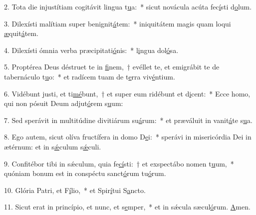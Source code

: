 2. Tota die injustítiam cogitávit lingua t\uline{u}a:~* sicut novácula acúta fec\uline{í}sti d\uline{o}lum.\par 
3. Dilexísti malítiam super benignit\uline{á}tem:~* iniquitátem magis quam loqui \uline{æ}quit\uline{á}tem.\par 
4. Dilexísti ómnia verba præcipitati\uline{ó}nis:~* l\uline{i}ngua dol\uline{ó}sa.\par 
5. Proptérea Deus déstruet te in \uline{fi}nem,~† evéllet te, et emigrábit te de tabernáculo t\uline{u}o:~* et radícem tuam de t\uline{e}rra viv\uline{é}ntium.\par 
6. Vidébunt justi, et ti\uline{mé}bunt,~† et super eum ridébunt et d\uline{i}cent:~* Ecce homo, qui non pósuit Deum adjut\uline{ó}rem s\uline{u}um:\par 
7. Sed sperávit in multitúdine divitiárum su\uline{á}rum:~* et præváluit in vanit\uline{á}te s\uline{u}a.\par 
8. Ego autem, sicut olíva fructífera in domo D\uline{e}i:~* sperávi in misericórdia Dei in ætérnum: et in s\uline{ǽ}culum s\uline{ǽ}culi.\par 
9. Confitébor tibi in sǽculum, quia fe\uline{cí}sti:~† et exspectábo nomen t\uline{u}um,~* quóniam bonum est in conspéctu sanct\uline{ó}rum tu\uline{ó}rum.\par 
10. Glória Patri, et F\uline{í}lio,~* et Spir\uline{í}tui S\uline{a}ncto.\par 
11. Sicut erat in princípio, et nunc, et s\uline{e}mper,~* et in sǽcula sæcul\uline{ó}rum. \uline{A}men.\par 

